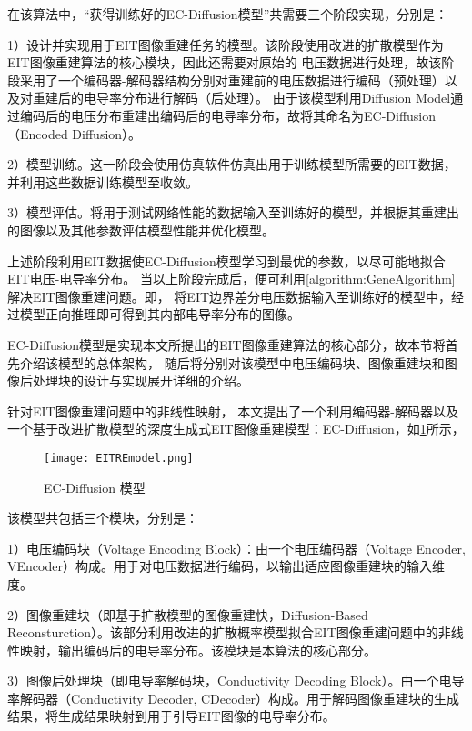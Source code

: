 在该算法中，“获得训练好的EC-Diffusion模型”共需要三个阶段实现，分别是：

1）设计并实现用于EIT图像重建任务的模型。该阶段使用改进的扩散模型作为EIT图像重建算法的核心模块，因此还需要对原始的
电压数据进行处理，故该阶段采用了一个编码器-解码器结构分别对重建前的电压数据进行编码（预处理）以及对重建后的电导率分布进行解码（后处理）。
由于该模型利用Diffusion Model通过编码后的电压分布重建出编码后的电导率分布，故将其命名为EC-Diffusion（Encoded Diffusion）。

2）模型训练。这一阶段会使用仿真软件仿真出用于训练模型所需要的EIT数据，并利用这些数据训练模型至收敛。

3）模型评估。将用于测试网络性能的数据输入至训练好的模型，并根据其重建出的图像以及其他参数评估模型性能并优化模型。

上述阶段利用EIT数据使EC-Diffusion模型学习到最优的参数，以尽可能地拟合EIT电压-电导率分布。
当以上阶段完成后，便可利用\cref{algorithm:GeneAlgorithm}解决EIT图像重建问题。即，
将EIT边界差分电压数据输入至训练好的模型中，经过模型正向推理即可得到其内部电导率分布的图像。



EC-Diffusion模型是实现本文所提出的EIT图像重建算法的核心部分，故本节将首先介绍该模型的总体架构，
随后将分别对该模型中电压编码块、图像重建块和图像后处理块的设计与实现展开详细的介绍。

\label{section:Model}

针对EIT图像重建问题中的非线性映射，
本文提出了一个利用编码器-解码器以及一个基于改进扩散模型的深度生成式EIT图像重建模型：EC-Diffusion，如\cref{figure:EITREmodel}所示，

\begin{figure}[h]
    \centering
    \texttt{[image: EITREmodel.png]}
    \caption{EC-Diffusion 模型}
    \label{figure:EITREmodel}
\end{figure}
该模型共包括三个模块，分别是：

1）电压编码块（Voltage Encoding Block）：由一个电压编码器（Voltage Encoder, VEncoder）构成。用于对电压数据进行编码，以输出适应图像重建块的输入维度。

2）图像重建块（即基于扩散模型的图像重建快，Diffusion-Based Reconsturction）。该部分利用改进的扩散概率模型拟合EIT图像重建问题中的非线性映射，输出编码后的电导率分布。该模块是本算法的核心部分。

3）图像后处理块（即电导率解码块，Conductivity Decoding Block）。由一个电导率解码器（Conductivity Decoder, CDecoder）构成。用于解码图像重建块的生成结果，将生成结果映射到用于引导EIT图像的电导率分布。

